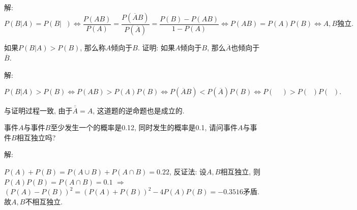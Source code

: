 \documentclass[standard]{ExBook}
\begin{document}
\begin{qitems}
\vspace{-5em}

    \begin{bbox}
解:
$$P(B|A) = P(B|\mathop{\overline{A}}) \Longleftrightarrow \frac{P(AB)}{P(A)}=\frac{P(\overline{A}B)}{P(\overline{A})}=\frac{P(B)-P(AB)}{1-P(A)} \Longleftrightarrow P(AB)=P(A)P(B) \Longleftrightarrow A,B\text{独立}.$$
    \end{bbox}

\vspace{-5em}

    \begin{bbox}
    \begin{shaded}
        \qitem
如果$P(B|A) > P(B)$, 那么称$A$倾向于$B$. 证明: 如果$A$倾向于$B$, 那么$\overline{A}$也倾向于$\overline{B}$.
    \end{shaded}
    \end{bbox}

\vspace{-5em}

    \begin{bbox}
解: 

$$P(B|A) > P(B) \Longleftrightarrow P(AB) > P(A)P(B) \Longleftrightarrow P(\overline{A}B) < P(\overline{A})P(B) \Longleftrightarrow P(\mathop{\overline{A}}\mathop{\overline{B}}) > P(\mathop{\overline{A}})P(\mathop{\overline{B}}).$$
    \end{bbox}

\vspace{-5em}

    \begin{bbox}
\textcolor{themeColor}{\selectfont {} 与证明过程一致, 由于$\overline{\overline{A}}=A$, 这道题的逆命题也是成立的.}
    \end{bbox}

\vspace{-5em}

    \begin{bbox}
    \begin{shaded}
        \qitem
事件$A$与事件$B$至少发生一个的概率是0.12, 同时发生的概率是0.1, 请问事件$A$与事件$B$相互独立吗?
    \end{shaded}
    \end{bbox}

\vspace{-5em}

    \begin{bbox}
解:

$P(A)+P(B)=P(A\cup B)+P(A\cap B)=0.22$, 反证法: 设$A,B$相互独立, 则$P(A)P(B)=P(A\cap B)=0.1$ $\Longrightarrow$ $\left(P(A)-P(B)\right)^2=\left(P(A)+P(B)\right)^2-4P(A)P(B)=-0.3516$矛盾. 故$A,B$不相互独立.


\end{bbox}
\end{qitems}
\end{document}
